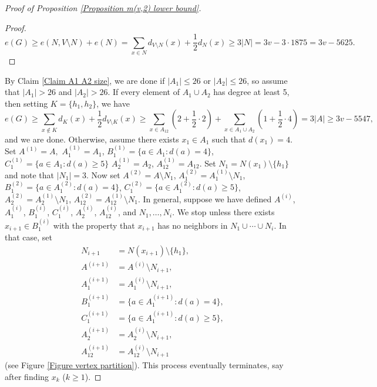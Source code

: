 \documentclass{article}
\newcommand\sm{\setminus}
\theoremstyle{definition}
\begin{document}
\begin{proof}[Proof of Proposition \ref{Proposition m(v,2) lower bound}]
\begin{proof}
        $$e(G)\ge e(N,V\sm N)+e(N)=\sum_{x\in N}d_{V\sm N}(x)+\frac{1}{2}d_N(x)\ge 3|N|=3v-3\cdot 1875=3v-5625.$$
    \end{proof}
    By Claim \ref{Claim A1 A2 size}, we are done if $|A_1|\le 26$ or $|A_2|\le 26$, so assume that $|A_1|>26$ and $|A_2|>26$. If every element of $A_1\cup A_2$ has degree at least 5, then setting $K=\{h_1,h_2\}$, we have
    $$e(G)\ge\sum_{x\not\in K}d_K(x)+\frac{1}{2}d_{V\sm K}(x)\ge\sum_{x\in A_{12}}\left(2+\frac{1}{2}\cdot 2\right)+\sum_{x\in A_1\cup A_2}\left(1+\frac{1}{2}\cdot 4\right)=3|A|\ge 3v-5547,$$
    and we are done. Otherwise, assume there exists $x_1\in A_1$ such that $d(x_1)=4$. Set $A^{(1)}=A,$ $A_1^{(1)}=A_1$, $B_1^{(1)}=\{a\in A_1: d(a)=4\}$, $C_1^{(1)}=\{a\in A_1:d(a)\ge 5\}$ $A_2^{(1)}=A_2$, $A_{12}^{(1)}=A_{12}$. Set $N_1=N(x_1)\sm\{h_1\}$ and note that $|N_1|=3$. Now set $A^{(2)}=A\sm N_1$, $A_1^{(2)}=A_1^{(1)}\sm N_1$, $B_1^{(2)}=\{a\in A_1^{(2)}: d(a)=4\}$, $C_1^{(2)}=\{a\in A_1^{(2)}: d(a)\ge 5\}$, $A_2^{(2)}=A_2^{(1)}\sm N_1$, $A_{12}^{(2)}=A_{12}^{(1)}\sm N_1$. In general, suppose we have defined $A^{(i)}$, $A_1^{(i)}$, $B_1^{(i)}$, $C_1^{(i)}$, $A_2^{(i)}$, $A_{12}^{(i)}$, and $N_1,\ldots,N_{i}$. We stop unless there exists $x_{i+1}\in B_1^{(i)}$ with the property that $x_{i+1}$ has no neighbors in $N_1\cup\cdots\cup N_{i}$. In that case, set 
    $$\begin{aligned}
            N_{i+1}&=N(x_{i+1})\sm \{h_1\},\\ A^{(i+1)}&=A^{(i)}\sm N_{i+1},\\ A_1^{(i+1)}&=A_1^{(i)}\sm N_{i+1},\\ B_1^{(i+1)}&=\{a\in A_1^{(i+1)}:d(a)=4\},\\
            C_1^{(i+1)}&=\{a\in A_1^{(i+1)}:d(a)\ge 5\},\\
            A_2^{(i+1)}&=A_2^{(i)}\sm N_{i+1},\\
            A_{12}^{(i+1)}&=A_{12}^{(i)}\sm N_{i+1}
    \end{aligned}$$
 (see Figure \ref{Figure vertex partition}). This process eventually terminates, say after finding $x_k$ ($k\ge 1$). 


\end{proof}
\end{document}
